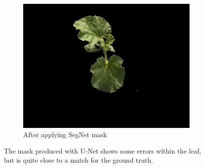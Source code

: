 \documentclass[letterpaper]{article}
\begin{document}
{\begin{figure}[H]
\begin{subfigure}[h]{.30\textwidth}
	  \includegraphics[width=1\linewidth]{figures/IMG_1115-original-masked.png}
	  \caption{After applying SegNet mask}
	  \label{fig:original-masked}
	\end{subfigure}
	\caption[U-Net segmentation vs ground truth]{The mask produced with U-Net shows some errors within the leaf, but is quite close to a match for the ground truth.}
	\label{fig:segmentation}
\end{figure}


}
\end{document}
